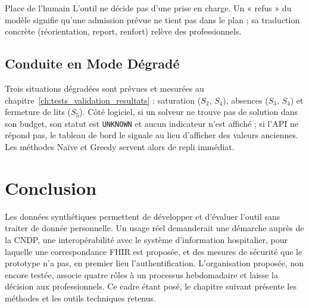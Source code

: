 \begin{notebox}{Place de l'humain}
L'outil ne décide pas d'une prise en charge. Un « refus » du modèle signifie qu'une admission prévue ne tient pas dans le plan ; sa traduction concrète (réorientation, report, renfort) relève des professionnels.
\end{notebox}

\subsection{Conduite en Mode Dégradé}
Trois situations dégradées sont prévues et mesurées au chapitre~\ref{ch:tests_validation_resultats} : saturation ($S_2$, $S_4$), absences ($S_3$, $S_4$) et fermeture de lits ($S_5$). Côté logiciel, si un solveur ne trouve pas de solution dans son budget, son statut est \texttt{UNKNOWN} et aucun indicateur n'est affiché ; si l'API ne répond pas, le tableau de bord le signale au lieu d'afficher des valeurs anciennes. Les méthodes Naïve et Greedy servent alors de repli immédiat.

\section*{Conclusion}
Les données synthétiques permettent de développer et d'évaluer l'outil sans traiter de donnée personnelle. Un usage réel demanderait une démarche auprès de la CNDP, une interopérabilité avec le système d'information hospitalier, pour laquelle une correspondance FHIR est proposée, et des mesures de sécurité que le prototype n'a pas, en premier lieu l'authentification. L'organisation proposée, non encore testée, associe quatre rôles à un processus hebdomadaire et laisse la décision aux professionnels. Ce cadre étant posé, le chapitre suivant présente les méthodes et les outils techniques retenus.
